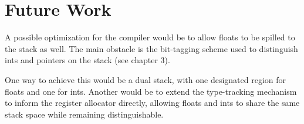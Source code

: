 \section{Future Work}

A possible optimization for the compiler would be to allow floats to be spilled to the stack as well. The main obstacle is the bit-tagging scheme used to distinguish ints and pointers on the stack (see chapter 3).

One way to achieve this would be a dual stack, with one designated region for floats and one for ints. Another would be to extend the type-tracking mechanism to inform the register allocator directly, allowing floats and ints to share the same stack space while remaining distinguishable. 